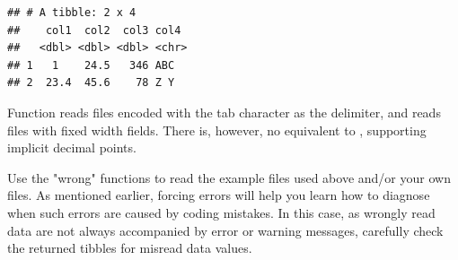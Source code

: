 \documentclass[krantz2]{krantz}\usepackage{knitr}
\begin{document}
\begin{knitrout}\footnotesize
{}\color{fgcolor}\begin{kframe}
\begin{alltt}
\hlstd{(} \hlstd{=} \hlstd{,}  \hlstd{=} \hlstd{)}
\end{alltt}


{\ttfamily\noindent\itshape{}}\begin{verbatim}
## # A tibble: 2 x 4
##    col1  col2  col3 col4 
##   <dbl> <dbl> <dbl> <chr>
## 1   1    24.5   346 ABC  
## 2  23.4  45.6    78 Z Y
\end{verbatim}
\end{kframe}
\end{knitrout}

Function  reads files encoded with the tab character as the delimiter, and  reads files with fixed width fields. There is, however, no equivalent to , supporting implicit decimal points.

\begin{playground}
Use the "wrong"  functions to read the example files used above and/or your own files. As mentioned earlier, forcing errors will help you learn how to diagnose when such errors are caused by coding mistakes. In this case, as wrongly read data are not always accompanied by error or warning messages, carefully check the returned tibbles for misread data values.
\end{playground}
\end{document}
